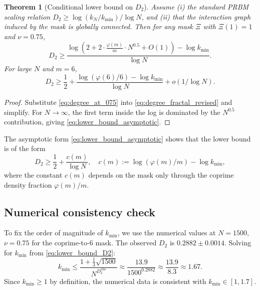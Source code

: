 \documentclass[11pt,a4paper]{article}
\newtheorem{theorem}{Theorem}[section]
\begin{document}
\begin{theorem}[Conditional lower bound on $D_2$]
\label{thm:lower_bound_D2}
\emph{Assume} (i) the standard PRBM scaling relation $D_2 \geq \log(k_N/k_{\min})/\log N$, and (ii) that the interaction graph induced by the mask is globally connected. \emph{Then} for any mask $\Xi$ with $\Xi(1) = 1$ and $\nu = 0.75$,
\begin{equation}
D_2 \geq \frac{\log\!\left(2 + 2 \cdot \frac{\varphi(m)}{m} \cdot N^{0.5} + O(1)\right) - \log k_{\min}}{\log N}.
\label{eq:lower_bound_D2}
\end{equation}
For large $N$ and $m = 6$,
\begin{equation}
D_2 \geq \frac{1}{2} + \frac{\log(\varphi(6)/6) - \log k_{\min}}{\log N} + o(1/\log N).
\label{eq:lower_bound_asymptotic}
\end{equation}
\end{theorem}

\begin{proof}
Substitute \cref{eq:degree_at_075} into \cref{eq:degree_fractal_revised} and simplify. For $N \to \infty$, the first term inside the log is dominated by the $N^{0.5}$ contribution, giving \cref{eq:lower_bound_asymptotic}.
\end{proof}

The asymptotic form \cref{eq:lower_bound_asymptotic} shows that the lower bound is of the form
\begin{equation}
D_2 \geq \frac{1}{2} + \frac{c(m)}{\log N}, \quad c(m) := \log(\varphi(m)/m) - \log k_{\min},
\end{equation}
where the constant $c(m)$ depends on the mask only through the coprime density fraction $\varphi(m)/m$.

\subsection{Numerical consistency check}
\label{subsec:numerical_consistency}

To fix the order of magnitude of $k_{\min}$, we use the numerical values at $N = 1500$, $\nu = 0.75$ for the coprime-to-6 mask. The observed $D_2$ is $0.2882 \pm 0.0014$. Solving for $k_{\min}$ from \cref{eq:lower_bound_D2}:
\begin{equation}
k_{\min} \leq \frac{1 + \frac{1}{3} \sqrt{1500}}{N^{D_2^{\text{obs}}}} \approx \frac{13.9}{1500^{0.2882}} \approx \frac{13.9}{8.3} \approx 1.67.
\end{equation}
Since $k_{\min} \geq 1$ by definition, the numerical data is consistent with $k_{\min} \in [1, 1.7]$.
\end{document}
